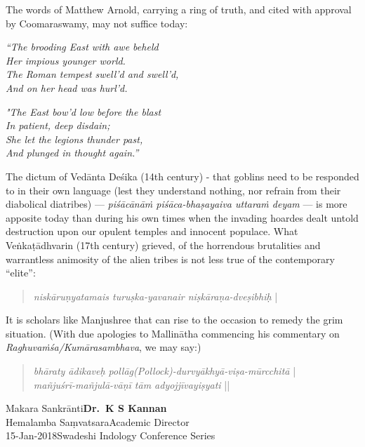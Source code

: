 The words of Matthew Arnold, carrying a ring of truth, and cited with approval by Coomaraswamy, may not suffice today:

\begin{myquote}
{{\sl ``The brooding East with awe beheld}}\\
{\sl Her impious younger world.}\\
{\sl The Roman tempest swell'd and swell'd,}\\
{\sl And on her head was hurl'd.}
\end{myquote}


\begin{myquote}
{{\sl "The East bow'd low before the blast}}\\
{\sl In patient, deep disdain;}\\
{\sl She let the legions thunder past,}\\
{\sl And plunged in thought again.''}
\end{myquote}

The dictum of Vedānta Deśika (14th century) - that goblins need to be responded to in their own language (lest they understand nothing, nor refrain from their diabolical diatribes) --- {\sl piśācānāṁ piśāca-bhaṣayaiva uttaraṁ deyam} --- is more apposite today than during his own times when the invading hoardes dealt untold destruction upon our opulent temples and innocent populace. What Veṅkaṭādhvarin (17th century) grieved, of the horrendous brutalities and warrantless animosity of the alien tribes is not less true of the contemporary ``elite'':
\begin{quote}
{{\sl niskāruṇyatamais turuṣka-yavanair niṣkāraṇa-dveṣibhiḥ}} |
\end{quote}

It is scholars like Manjushree that can rise to the occasion to remedy the grim situation. (With due apologies to Mallinātha commencing his commentary on {\sl Raghuvaṁśa/Kumārasambhava}, we may say:)
\begin{quote}
{{\sl bhāraty ādikaveḥ pollāg(Pollock)-durvyākhyā-viṣa-mūrcchitā}} |\\
{\sl mañjuśrī-mañjulā-vāṇī tām adyojjīvayiṣyati} ||
\end{quote}


\noindent
Makara Sankrānti\hfill	{\bf Dr.~K S Kannan}\\
Hemalamba Saṃvatsara\hfill Academic Director\\
15-Jan-2018\hfill Swadeshi Indology Conference Series

